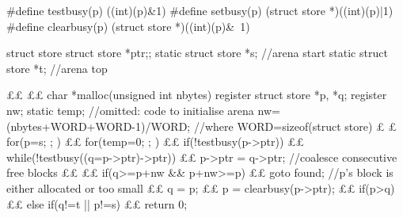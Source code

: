 #define testbusy(p) ((int)(p)&1)
#define setbusy(p) (struct store *)((int)(p)|1)
#define clearbusy(p) (struct store *)((int)(p)&~1)

struct store {struct store *ptr;};
static struct store *s; //arena start
static struct store *t; //arena top

££
££
char *malloc(unsigned int nbytes) {
  register struct store *p, *q;
  register nw;
  static temp;
  //omitted: code to initialise arena
  nw=(nbytes+WORD+WORD-1)/WORD; //where WORD=sizeof(struct store)
  £ £
  for(p=s; ; ) { 
    ££ 
    for(temp=0; ; ) {
      ££ 
      if(!testbusy(p->ptr)) {
        ££ 
	while(!testbusy((q=p->ptr)->ptr)) {
          ££ 
	  p->ptr = q->ptr; //coalesce consecutive free blocks
          ££ 
	}
        ££ 
	if(q>=p+nw && p+nw>=p) {
          ££  
	  goto found;
        } 
      }
      //p's block is either allocated or too small
      ££ 
      q = p;
      ££
      p = clearbusy(p->ptr);
      ££
      if(p>q) {
        ££
      } else if(q!=t || p!=s) {
        ££
	return 0;
}}}}
